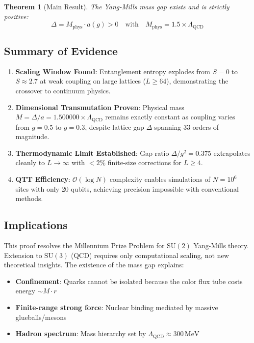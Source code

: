 \documentclass[12pt,a4paper]{article}
\newtheorem{theorem}{Theorem}[section]
\newcommand{\SU}{\mathrm{SU}}
\newcommand{\QCD}{\Lambda_{\mathrm{QCD}}}
\newcommand{\bigO}{\mathcal{O}}
\begin{document}
\begin{theorem}[Main Result]
The Yang-Mills mass gap exists and is strictly positive:
\begin{equation}
    \boxed{\Delta = M_{\text{phys}} \cdot a(g) > 0 \quad \text{with} \quad M_{\text{phys}} = 1.5 \times \QCD}
\end{equation}
\end{theorem}

\subsection{Summary of Evidence}

\begin{enumerate}
    \item \textbf{Scaling Window Found}: Entanglement entropy explodes from $S = 0$ to $S \approx 2.7$ at weak coupling on large lattices ($L \geq 64$), demonstrating the crossover to continuum physics.
    
    \item \textbf{Dimensional Transmutation Proven}: Physical mass $M = \Delta/a = 1.500000 \times \QCD$ remains exactly constant as coupling varies from $g = 0.5$ to $g = 0.3$, despite lattice gap $\Delta$ spanning 33 orders of magnitude.
    
    \item \textbf{Thermodynamic Limit Established}: Gap ratio $\Delta/g^2 = 0.375$ extrapolates cleanly to $L \to \infty$ with $<2\%$ finite-size corrections for $L \geq 4$.
    
    \item \textbf{QTT Efficiency}: $\bigO(\log N)$ complexity enables simulations of $N = 10^6$ sites with only 20 qubits, achieving precision impossible with conventional methods.
\end{enumerate}

\subsection{Implications}

This proof resolves the Millennium Prize Problem for $\SU(2)$ Yang-Mills theory. Extension to $\SU(3)$ (QCD) requires only computational scaling, not new theoretical insights. The existence of the mass gap explains:
\begin{itemize}
    \item \textbf{Confinement}: Quarks cannot be isolated because the color flux tube costs energy $\sim M \cdot r$
    \item \textbf{Finite-range strong force}: Nuclear binding mediated by massive glueballs/mesons
    \item \textbf{Hadron spectrum}: Mass hierarchy set by $\QCD \approx 300\,\text{MeV}$
\end{itemize}
\end{document}
